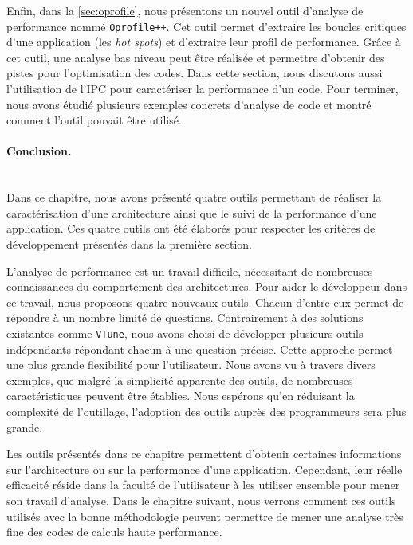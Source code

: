     Enfin, dans la \autoref{sec:oprofile}, nous présentons un nouvel outil d'analyse de performance nommé \verb=Oprofile++=. Cet outil permet d'extraire les boucles critiques d'une application (les \textit{hot spots}) et d'extraire leur profil de performance. Grâce à cet outil, une analyse bas niveau peut être réalisée et permettre d'obtenir des pistes pour l'optimisation des codes. Dans cette section, nous discutons aussi l'utilisation de l'IPC pour caractériser la performance d'un code. Pour terminer, nous avons étudié plusieurs exemples concrets d'analyse de code et montré comment l'outil pouvait être utilisé.
    
    
\paragraph{Conclusion.}
~\\
    
    Dans ce chapitre, nous avons présenté quatre outils permettant de réaliser la caractérisation d'une architecture ainsi que le suivi de la performance d'une application. Ces quatre outils ont été élaborés pour respecter les critères de développement présentés dans la première section. 
    
    L'analyse de performance est un travail difficile, nécessitant de nombreuses connaissances du comportement des architectures. Pour aider le développeur dans ce travail, nous proposons quatre nouveaux outils. Chacun d'entre eux permet de répondre à un nombre limité de questions. Contrairement à des solutions existantes comme \verb|VTune|, nous avons choisi de développer plusieurs outils indépendants répondant chacun à une question précise. Cette approche permet une plus grande flexibilité pour l'utilisateur. Nous avons vu à travers divers exemples, que malgré la simplicité apparente des outils, de nombreuses caractéristiques peuvent être établies. Nous espérons qu'en réduisant la complexité de l'outillage, l'adoption des outils auprès des programmeurs sera plus grande.
    
    Les outils présentés dans ce chapitre permettent d'obtenir certaines informations sur l'architecture ou sur la performance d'une application. Cependant, leur réelle efficacité réside dans la faculté de l'utilisateur à les utiliser ensemble pour mener son travail d'analyse. Dans le chapitre suivant, nous verrons comment ces outils utilisés avec la bonne méthodologie peuvent permettre de mener une analyse très fine des codes de calculs haute performance.